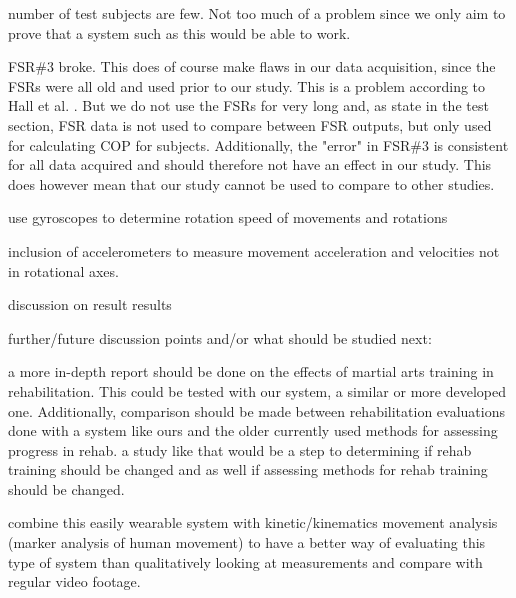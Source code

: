 
number of test subjects are few. Not too much of a problem since we only aim to prove that a system such as this would be able to work.

FSR\#3 broke. This does of course make flaws in our data acquisition, since the FSRs were all old and used prior to our study. This is a problem according to Hall et al. \cite{Hall2008}. But we do not use the FSRs for very long and, as state in the test section, FSR data is not used to compare between FSR outputs, but only used for calculating COP for subjects. Additionally, the "error" in FSR\#3 is consistent for all data acquired and should therefore not have an effect in our study. This does however mean that our study cannot be used to compare to other studies.

use gyroscopes to determine rotation speed of movements and rotations

inclusion of accelerometers to measure movement acceleration and velocities not in rotational axes.

discussion on result results





further/future discussion points and/or what should be studied next:

a more in-depth report should be done on the effects of martial arts training in rehabilitation. This could be tested with our system, a similar or more developed one. Additionally, comparison should be made between rehabilitation evaluations done with a system like ours and the older currently used methods for assessing progress in rehab. a study like that would be a step to determining if rehab training should be changed and as well if assessing methods for rehab training should be changed.

combine this easily wearable system with kinetic/kinematics movement analysis (marker analysis of human movement) to have a better way of evaluating this type of system than qualitatively looking at measurements and compare with regular video footage. 